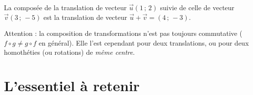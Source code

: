 \begin{exemple}
La composée de la translation de vecteur $\vec u(1\,;\,2)$ suivie de celle de vecteur
$\vec v(3\,;\,-5)$ est la translation de vecteur $\vec u+\vec v=(4\,;\,-3)$.
\end{exemple}

\begin{remarque}
Attention : la composition de transformations n'est pas toujours commutative
($f\circ g\neq g\circ f$ en général). Elle l'est cependant pour deux translations,
ou pour deux homothéties (ou rotations) de \emph{même centre}.
\end{remarque}

\section{L'essentiel à retenir}

